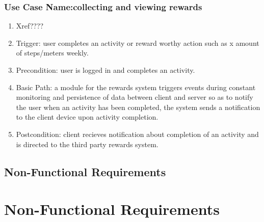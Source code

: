 \documentclass[11pt,a4paper]{article}
\begin{document}
			\subsubsection{Use Case Name:collecting and viewing rewards}
				\begin{enumerate}
				\renewcommand{\labelenumi}{{\textbf{\arabic{enumi}.}}}
				\item Xref????  %
				\item Trigger: user completes an activity or reward worthy action such as x amount of steps/meters weekly.
				\item Precondition: user is logged in and completes an activity.
				\item Basic Path: a module for the rewards system triggers events during constant monitoring and persistence of data between client and server so as to notify the user when an activity has been completed, the system sends a notification to the client device upon activity completion.
				\item Postcondition: client recieves notification about completion of an activity and is directed to the third party rewards system.
				\end{enumerate}
			
			
			
		
	\subsection{Non-Functional Requirements}
		\section {Non-Functional Requirements}
\end{document}
